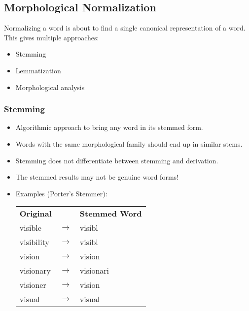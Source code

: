         \subsection{Morphological Normalization} %
            Normalizing a word is about to find a single canonical representation of a word. This gives multiple approaches:
            \begin{itemize}
            	\item Stemming
            	\item Lemmatization
            	\item Morphological analysis
            \end{itemize}

            \subsubsection{Stemming} %
                \begin{itemize}
                	\item Algorithmic approach to bring any word in its stemmed form.
                	\item Words with the same morphological family should end up in similar stems.
                	\item Stemming does not differentiate between stemming and derivation.
                	\item The stemmed results may not be genuine word forms!
                	\item Examples (Porter's Stemmer):
                		\begin{table}[H]
                			\centering
                			\begin{tabular}{l c l}
                				\textbf{Original} &                 & \textbf{Stemmed Word} \\
                				visible           & \(\rightarrow\) & visibl                \\
                				visibility        & \(\rightarrow\) & visibl                \\
                				vision            & \(\rightarrow\) & vision                \\
                				visionary         & \(\rightarrow\) & visionari             \\
                				visioner          & \(\rightarrow\) & vision                \\
                				visual            & \(\rightarrow\) & visual
                			\end{tabular}
                		\end{table}
                \end{itemize}

